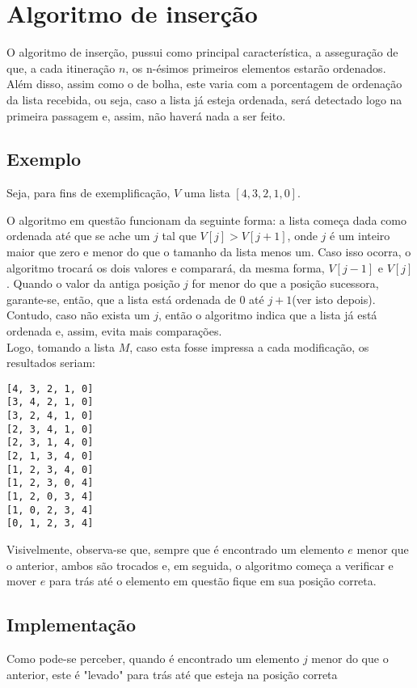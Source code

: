 \section{Algoritmo de inserção}
O algoritmo de inserção, pussui como principal característica, a asseguração de que, a cada itineração $n$, os n-ésimos primeiros elementos estarão ordenados. Além disso, assim como o de bolha, este varia com a porcentagem de ordenação da lista recebida, ou seja, caso a lista já esteja ordenada, será detectado logo na primeira passagem e, assim, não haverá nada a ser feito. 


\subsection*{Exemplo}
Seja, para fins de exemplificação, $V$ uma lista $[4,3,2,1,0]$.  

O algoritmo em questão funcionam da seguinte forma: a lista começa dada como ordenada até que se ache um $j$ tal que $V[j]>V[j+1]$, onde $j$ é um inteiro maior que zero e menor do que o tamanho da lista menos um. 
Caso isso ocorra, o algoritmo trocará os dois valores e comparará, da mesma forma, $V[j-1]$ e $V[j]$. Quando o valor da antiga posição $j$ for menor do que a posição sucessora, garante-se, então, que a lista está ordenada de 0 até $j+1$(ver isto depois). Contudo, caso não exista um $j$, então o algoritmo indica que a lista já está ordenada e, assim, evita mais comparações.
\\

Logo, tomando a lista $M$, caso esta fosse impressa a cada modificação, os resultados seriam:
\begin{lstlisting}
[4, 3, 2, 1, 0]
[3, 4, 2, 1, 0]
[3, 2, 4, 1, 0]
[2, 3, 4, 1, 0]
[2, 3, 1, 4, 0]
[2, 1, 3, 4, 0]
[1, 2, 3, 4, 0]
[1, 2, 3, 0, 4]
[1, 2, 0, 3, 4]
[1, 0, 2, 3, 4]
[0, 1, 2, 3, 4]
\end{lstlisting}

Visivelmente, observa-se que, sempre que é encontrado um elemento $e$ menor que o anterior, ambos são trocados e, em seguida, o algoritmo começa a verificar e mover $e$ para trás até o elemento em questão fique em sua posição correta.
\newpage

\subsection*{Implementação}
Como pode-se perceber, quando é encontrado um elemento $j$ menor do que o anterior, este é "levado" para trás até que esteja na posição correta

